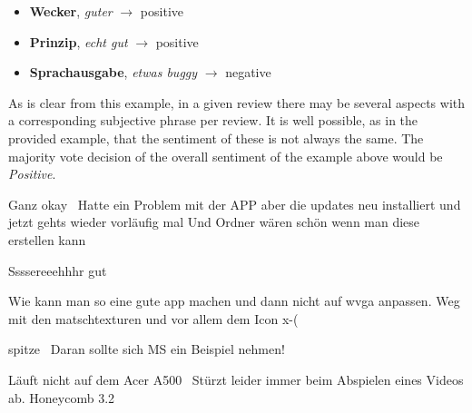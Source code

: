 \begin{itemize}
  \item \textbf{Wecker}, \textit{guter} $\rightarrow$ positive
  \item \textbf{Prinzip}, \textit{echt gut} $\rightarrow$ positive
  \item \textbf{Sprachausgabe}, \textit{etwas buggy} $\rightarrow$ negative
\end{itemize}

As is clear from this example, in a given review there may be several aspects with a corresponding
subjective phrase per review.
It is well possible, as in the provided example, that the sentiment of these is not always the
same.
The majority vote decision of the overall sentiment of the example above would be \emph{Positive}.

\begin{examples}
\item Ganz okay \textbar\textbar\ Hatte ein Problem mit der APP aber die updates neu installiert und jetzt gehts wieder vorläufig mal Und Ordner wären schön wenn man diese erstellen kann \hfill{}
\end{examples}

\begin{examples}
\item Ssssereeehhhr gut \hfill{}
\end{examples}

\begin{examples}
\item Wie kann man so eine gute app machen und dann nicht auf wvga anpassen. Weg mit den matschtexturen und vor allem dem Icon x-( \hfill{}
\end{examples}

\begin{examples}
\item spitze \textbar\textbar\ Daran sollte sich MS ein Beispiel nehmen! \hfill{}
\end{examples}

\begin{examples}
\item Läuft nicht auf dem Acer A500 \textbar\textbar\ Stürzt leider immer beim Abspielen eines Videos ab. Honeycomb 3.2 \hfill{}
\end{examples}


